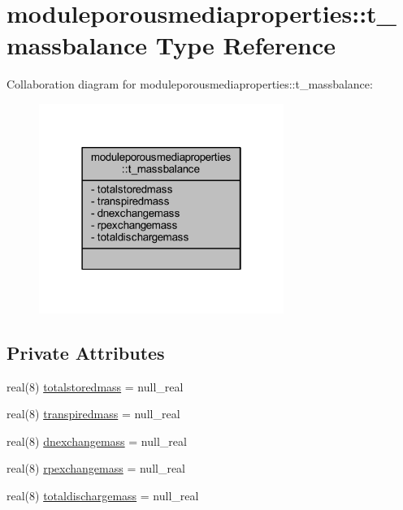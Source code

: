 \hypertarget{structmoduleporousmediaproperties_1_1t__massbalance}{}\section{moduleporousmediaproperties\+:\+:t\+\_\+massbalance Type Reference}
\label{structmoduleporousmediaproperties_1_1t__massbalance}


Collaboration diagram for moduleporousmediaproperties\+:\+:t\+\_\+massbalance\+:\nopagebreak
\begin{figure}[H]
\begin{center}
\leavevmode
\includegraphics[width=226pt]{structmoduleporousmediaproperties_1_1t__massbalance__coll__graph}
\end{center}
\end{figure}
\subsection*{Private Attributes}
\begin{DoxyCompactItemize}
\item 
real(8) \mbox{\hyperlink{structmoduleporousmediaproperties_1_1t__massbalance_ade431238411848caee004e844b621eb2}{totalstoredmass}} = null\+\_\+real
\item 
real(8) \mbox{\hyperlink{structmoduleporousmediaproperties_1_1t__massbalance_a1f62b856fc39f016c038ba1aa630e14c}{transpiredmass}} = null\+\_\+real
\item 
real(8) \mbox{\hyperlink{structmoduleporousmediaproperties_1_1t__massbalance_a0535e5756bec111be91f1d9997507b94}{dnexchangemass}} = null\+\_\+real
\item 
real(8) \mbox{\hyperlink{structmoduleporousmediaproperties_1_1t__massbalance_a231efacca77c1e9cb28fa475594fd4f9}{rpexchangemass}} = null\+\_\+real
\item 
real(8) \mbox{\hyperlink{structmoduleporousmediaproperties_1_1t__massbalance_a969ae2e9859bc3b60a88b84747f0094f}{totaldischargemass}} = null\+\_\+real
\end{DoxyCompactItemize}


